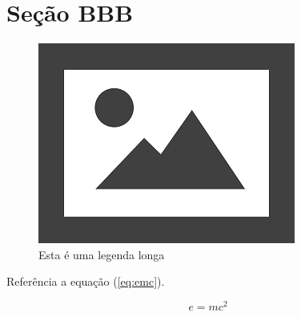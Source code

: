 \documentclass{article}
\begin{document}
	\section{Seção BBB}	
	
	\begin{figure}[H]
		\centering
		\includegraphics[width=0.5\linewidth]{Figuras/fig3}
		\caption[Legenda curta]{Esta é uma legenda longa}
		\label{fig:fig3}
	\end{figure}
	
	Referência a equação (\ref{eq:emc}).
	
	\begin{equation}
	\label{eq:emc}
		e=mc^2
	\end{equation}
\end{document}

